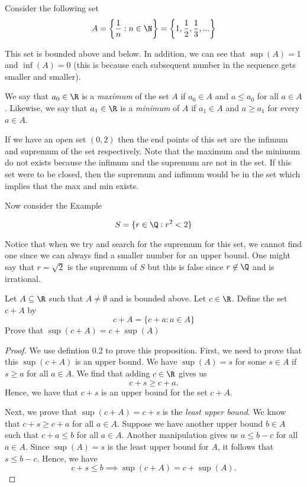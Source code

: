 Consider the following set
\[ A = \bigg\{ \frac{1}{n} : n \in \N \bigg\} = \bigg\{ 1,\frac{1}{2}, \frac{1}{3},... \bigg\}\]

This set is bounded above and below. In addition, we can see that \( \sup(A) = 1 \) and \( \inf(A) = 0 \) (this is because each subsequent number in the sequence gets smaller and smaller). 


\begin{tcolorbox}
    \begin{defn}
        We say that \( a_0 \in \R \) is a \textit{maximum} of the set \( A \) if \( a_0 \in A \) and \( a \leq a_0 \) for all \( a \in A \). Likewise, we say that \(a_1 \in \R \) is a \textit{minimum} of \( A \) if \( a_1 \in A \) and \( a \geq a_1 \) for every \( a \in A \).  
    \end{defn}
\end{tcolorbox}

If we have an open set \( (0,2) \) then the end points of this set are the infimum and supremum of the set respectively. Note that the maximum and the minimum do not exists because the infimum and the supremum are not in the set. If this set were to be closed, then the supremum and infimum would be in the set which implies that the max and min exists. 

Now consider the Example

\[ S = \{ r \in \Q: r^2 < 2 \} \]

Notice that when we try and search for the supremum for this set, we cannot find one since we can always find a smaller number for an upper bound. One might say that \( r = \sqrt{2} \) is the supremum of \( S \) but this is false since \( r \not\in \Q \) and is irrational. 


\begin{ex}
    Let \( A \subseteq \R \) such that \( A \neq \emptyset \) and is bounded above. Let \( c \in \R \). Define the set 
    \( c + A \) by 
    \[ c + A = \{ c + a: a \in A  \}  \] 
    Prove that \( \sup(c+A) = c + \sup(A) \) 

    \begin{proof}
        We use defintion 0.2 to prove this proposition. First, we need to prove that this \( \sup(c + A) \) is an upper bound. We have \( \sup(A) = s \) for some \( s \in A \) if \( s \geq a \) for all \( a \in A \). We find that adding \( c \in \R \) gives us
        \[  c+s \geq c + a.\]
        Hence, we have that \( c + s \) is an upper bound for the set \( c + A \). 

        Next, we prove that \( \sup(c+ A) = c + s \) is the \textit{least upper bound}. We know that \( c + s \geq c + a \) for all \( a \in A \). Suppose we have another upper bound \( b \in A \) such that \( c + a \leq b \) for all \( a \in A \). Another manipulation gives us \( a \leq b - c \) for all \( a \in A \). Since \( \sup(A) = s \) is the least upper bound for \( A \), it follows that 
        \( s \leq b - c \). Hence, we have 
        \[ c+s \leq b \implies \sup(c+A) = c + \sup(A). \]
    \end{proof}
\end{ex}

